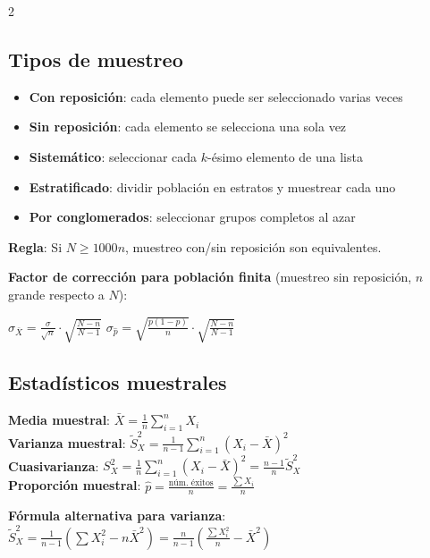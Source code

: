 \documentclass[9pt,a4paper]{article}
\begin{document}
\begin{multicols}{2}
\subsection{Tipos de muestreo}
\begin{itemize}[leftmargin=*]
\item \textbf{Con reposición}: cada elemento puede ser seleccionado varias veces
\item \textbf{Sin reposición}: cada elemento se selecciona una sola vez
\item \textbf{Sistemático}: seleccionar cada $k$-ésimo elemento de una lista
\item \textbf{Estratificado}: dividir población en estratos y muestrear cada uno
\item \textbf{Por conglomerados}: seleccionar grupos completos al azar
\end{itemize}

\begin{alertbox}
\textbf{Regla}: Si $N\geq 1000n$, muestreo con/sin reposición son equivalentes.
\end{alertbox}

\textbf{Factor de corrección para población finita} (muestreo sin reposición, $n$ grande respecto a $N$):
\begin{formulabox}
$\sigma_{\bar{X}}=\frac{\sigma}{\sqrt{n}}\cdot\sqrt{\frac{N-n}{N-1}}$\quad
$\sigma_{\hat{p}}=\sqrt{\frac{p(1-p)}{n}}\cdot\sqrt{\frac{N-n}{N-1}}$
\end{formulabox}

\subsection{Estadísticos muestrales}
\begin{formulabox}
\textbf{Media muestral}: $\bar{X}=\frac{1}{n}\sum_{i=1}^n X_i$\\[5pt]
\textbf{Varianza muestral}: $\tilde{S}^2_X=\frac{1}{n-1}\sum_{i=1}^n(X_i-\bar{X})^2$\\[5pt]
\textbf{Cuasivarianza}: $S^2_X=\frac{1}{n}\sum_{i=1}^n(X_i-\bar{X})^2=\frac{n-1}{n}\tilde{S}^2_X$\\[5pt]
\textbf{Proporción muestral}: $\hat{p}=\frac{\text{núm. éxitos}}{n}=\frac{\sum X_i}{n}$
\end{formulabox}

\textbf{Fórmula alternativa para varianza}:\\
$\tilde{S}^2_X=\frac{1}{n-1}\left(\sum X_i^2-n\bar{X}^2\right)=\frac{n}{n-1}\left(\frac{\sum X_i^2}{n}-\bar{X}^2\right)$


\end{multicols}
\end{document}

